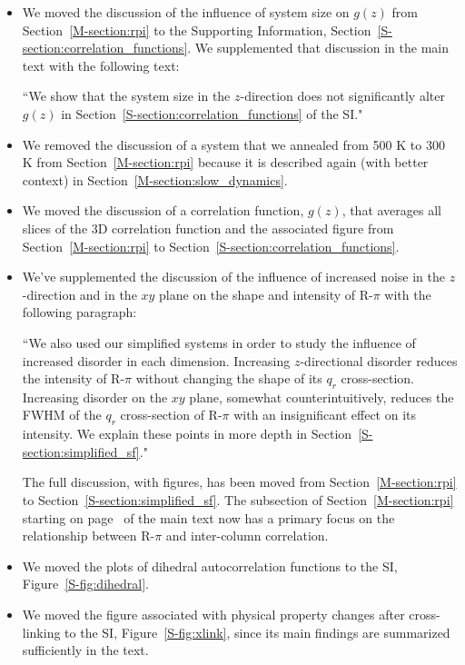 \documentclass{article}
\begin{document}
\begin{enumerate}
\begin{itemize}
    \item We moved the discussion of the influence of system size on $g(z)$ 
    from Section~\ref{M-section:rpi} to the Supporting Information, 
    Section~\ref{S-section:correlation_functions}. We supplemented that discussion in
    the main text with the following text:    
    
    ``We show that the system size in the $z$-direction does not significantly 
    alter $g(z)$ in Section~\ref{S-section:correlation_functions} of the SI."
    
    \item We removed the discussion of a system that we annealed from 500 K to 300 K
    from Section~\ref{M-section:rpi} because it is described again (with better context)
    in Section~\ref{M-section:slow_dynamics}.
    
	\item We moved the discussion of a correlation function, $g(z)$, that averages
	all slices of the 3D correlation function and the associated figure from 
	Section~\ref{M-section:rpi} to Section~\ref{S-section:correlation_functions}.
    
    \item We've supplemented the discussion of the influence of increased noise in the 
    $z$-direction and in the $xy$ plane on the shape and intensity of R-$\pi$ with the
    following paragraph:
    
    ``We also used our simplified systems in order to study the influence of increased
    disorder in each dimension. Increasing $z$-directional disorder reduces the
    intensity of R-$\pi$ without changing the shape of its $q_r$ cross-section.
    Increasing disorder on the $xy$ plane, somewhat counterintuitively, reduces
    the FWHM of the $q_r$ cross-section of R-$\pi$ with an insignificant effect
    on its intensity. We explain these points in more depth in 
    Section~\ref{S-section:simplified_sf}."
    
    The full discussion, with figures, has been moved from Section~\ref{M-section:rpi}
    to Section~\ref{S-section:simplified_sf}. The subsection of Section~\ref{M-section:rpi}
    starting on page~\pageref{M-section:rpi_xsection} of the main text now has a primary
    focus on the relationship between R-$\pi$ and inter-column correlation.
    
    \item We moved the plots of dihedral autocorrelation functions to the SI, 
    Figure~\ref{S-fig:dihedral}.
    
    \item We moved the figure associated with physical property changes after cross-linking
    to the SI, Figure~\ref{S-fig:xlink}, since its main findings are summarized sufficiently
    in the text.
    
    \end{itemize}
	
\end{enumerate}
\end{document}
